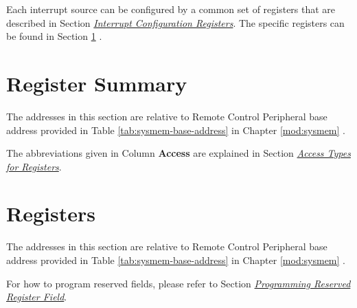 \documentclass[main\_\_EN.tex]{subfiles}
\begin{document}
Each interrupt source can be configured by a common set of registers that are described in Section \hyperref[interrupt-config-registers]{\textit{Interrupt Configuration Registers}}. The specific registers can be found in Section \ref{sec:rmt-reg-summ} \textit{}.





\newpage
\hypertarget{rmt-reg-summ}{}
\section{Register Summary}
\label{sec:rmt-reg-summ}

The addresses in this section are relative to Remote Control Peripheral base address provided in Table \ref{tab:sysmem-base-address} in Chapter \ref{mod:sysmem} \textit{}.

The abbreviations given in Column \textbf{Access} are explained in Section \hyperref[glossary-access-types]{\textit{Access Types for Registers}}.






\newpage
\section{Registers}

The addresses in this section are relative to Remote Control Peripheral  base address provided in Table \ref{tab:sysmem-base-address} in Chapter \ref{mod:sysmem} \textit{}.

For how to program reserved fields, please refer to Section \hyperref[programming-reserved-field]{\textit{Programming Reserved Register Field}}.


\end{document}
